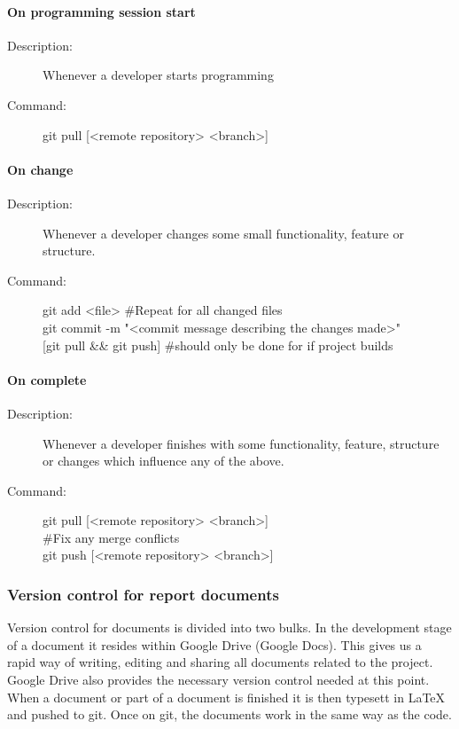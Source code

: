 \paragraph{On programming session start}
\begin{description}
\item[Description:] Whenever a developer starts programming
\item[Command:] git pull [<remote repository> <branch>]
\end{description}

\paragraph{On change}
\begin{description}
\item[Description:] Whenever a developer changes some small functionality, feature or structure.
\item[Command:] git add <file> \#Repeat for all changed files \\
\hspace*{3em} git commit -m "<commit message describing the changes made>"\\
\hspace*{3em} [git pull \&\& git push] \#should only be done for if project builds
\end{description}

\paragraph{On complete}
\begin{description}
\item[Description:]  Whenever a developer finishes with some functionality, feature,  structure or changes 
\hspace*{4em}which influence any of the above.
\item[Command:]  git pull [<remote repository> <branch>] \\ 
\hspace*{3em} \#Fix any merge conflicts \\
\hspace*{3.5em}git push [<remote repository> <branch>]
\end{description}

\subsubsection{Version control for report documents}
Version control for documents is divided into two bulks. In the development stage of a document it resides within Google Drive (Google Docs). This gives us a rapid way of writing, editing and sharing all documents related to the project. Google Drive also provides the necessary version control needed at this point. When a document or part of a document is finished it is then typesett in LaTeX and pushed to git. Once on git, the documents work in the same way as the code.  


